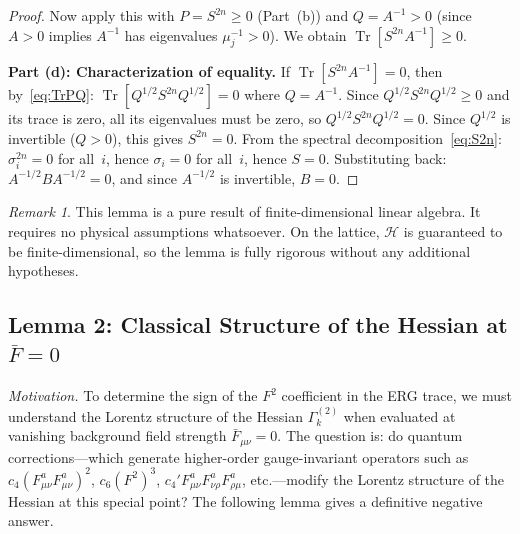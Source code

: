 \documentclass[12pt,a4paper]{article}
\theoremstyle{plain}
\theoremstyle{definition}
\theoremstyle{remark}
\newtheorem{remark}[theorem]{Remark}
\begin{document}
\begin{proof}
Now apply this with $P=S^{2n}\geq 0$ (Part~(b)) and $Q=A^{-1}>0$ (since $A>0$ implies $A^{-1}$ has eigenvalues $\mu_j^{-1}>0$). We obtain $\operatorname{Tr}[S^{2n}A^{-1}]\geq 0$.

\textbf{Part (d): Characterization of equality.} If $\operatorname{Tr}[S^{2n}A^{-1}]=0$, then by~\eqref{eq:TrPQ}: $\operatorname{Tr}[Q^{1/2}S^{2n}Q^{1/2}]=0$ where $Q=A^{-1}$. Since $Q^{1/2}S^{2n}Q^{1/2}\geq 0$ and its trace is zero, all its eigenvalues must be zero, so $Q^{1/2}S^{2n}Q^{1/2}=0$. Since $Q^{1/2}$ is invertible ($Q>0$), this gives $S^{2n}=0$. From the spectral decomposition~\eqref{eq:S2n}: $\sigma_i^{2n}=0$ for all~$i$, hence $\sigma_i=0$ for all~$i$, hence $S=0$. Substituting back: $A^{-1/2}BA^{-1/2}=0$, and since $A^{-1/2}$ is invertible, $B=0$.
\end{proof}

\begin{remark}
This lemma is a pure result of finite-dimensional linear algebra. It requires no physical assumptions whatsoever. On the lattice, $\mathcal{H}$ is guaranteed to be finite-dimensional, so the lemma is fully rigorous without any additional hypotheses.
\end{remark}

\subsection{Lemma 2: Classical Structure of the Hessian at $\bar{F}=0$}\label{sec:lemma2}

\textit{Motivation.} To determine the sign of the $F^2$ coefficient in the ERG trace, we must understand the Lorentz structure of the Hessian $\Gamma_k^{(2)}$ when evaluated at vanishing background field strength $\bar{F}_{\mu\nu}=0$. The question is: do quantum corrections---which generate higher-order gauge-invariant operators such as $c_4(F_{\mu\nu}^a F_{\mu\nu}^a)^2$, $c_6(F^2)^3$, $c_4'F_{\mu\nu}^a F_{\nu\rho}^a F_{\rho\mu}^a$, etc.---modify the Lorentz structure of the Hessian at this special point? The following lemma gives a definitive negative answer.
\end{document}
